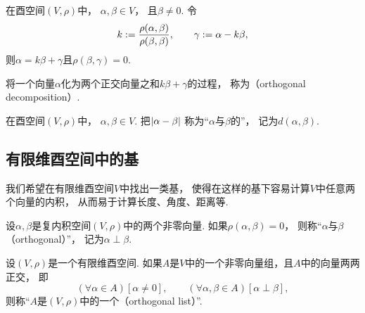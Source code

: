 \begin{proposition}\label{theorem:酉空间.向量的正交分解}
在酉空间\((V,\rho)\)中，
\(\alpha,\beta \in V\)，
且\(\beta \neq 0\).
令\begin{equation*}
	k := \frac{\rho(\alpha,\beta)}{\rho(\beta,\beta)},
	\qquad
	\gamma := \alpha - k \beta,
\end{equation*}
则\(\alpha = k\beta + \gamma\)且\(\rho(\beta,\gamma) = 0\).
\end{proposition}
\begin{remark}
将一个向量\(\alpha\)化为两个正交向量之和\(k\beta + \gamma\)的过程，
称为（orthogonal decomposition）.
\end{remark}

\begin{definition}
在酉空间\((V,\rho)\)中，
\(\alpha,\beta \in V\).
把\(\abs{\alpha-\beta}\)
称为“\(\alpha\)与\(\beta\)的”，
记为\(d(\alpha,\beta)\).
\end{definition}

\subsection{有限维酉空间中的基}
我们希望在有限维酉空间\(V\)中找出一类基，
使得在这样的基下容易计算\(V\)中任意两个向量的内积，
从而易于计算长度、角度、距离等.

\begin{definition}
设\(\alpha,\beta\)是复内积空间\((V,\rho)\)中的两个非零向量.
如果\(\rho(\alpha,\beta) = 0\)，
则称“\(\alpha\)与\(\beta\) （orthogonal）”，
记为\(\alpha \perp \beta\).
\end{definition}

\begin{definition}
设\((V,\rho)\)是一个有限维酉空间.
如果\(A\)是\(V\)中的一个非零向量组，且\(A\)中的向量两两正交，
即\begin{equation*}
	(\forall \alpha \in A)
	[\alpha\neq0],
	\qquad
	(\forall \alpha,\beta \in A)
	[\alpha \perp \beta],
\end{equation*}
则称“\(A\)是\((V,\rho)\)中的一个（orthogonal list）”.
\end{definition}

